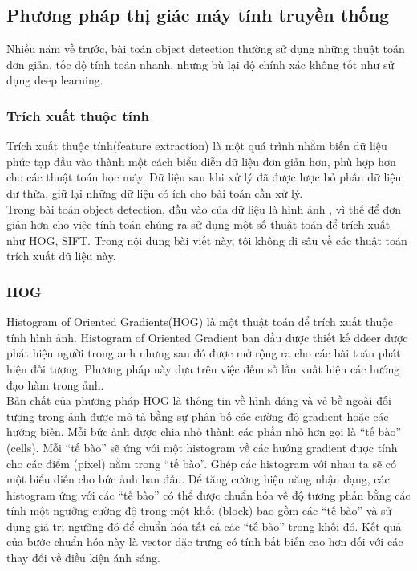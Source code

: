 \documentclass[a4paper]{report}
\begin{document}
\subsection{Phương pháp thị giác máy tính truyền thống}
Nhiều năm về trước, bài toán object detection thường sử dụng những thuật toán đơn giản, tốc độ tính toán nhanh, nhưng bù lại độ chính xác không tốt như sử dụng deep learning.
\subsubsection*{Trích xuất thuộc tính}
Trích xuất thuộc tính(feature extraction) là một quá trình nhằm biến dữ liệu phức tạp đầu vào thành một cách biểu diễn dữ liệu đơn giản hơn, phù hợp hơn cho các thuật toán học máy. Dữ liệu sau khi xử lý đã được lược bỏ phần dữ liệu dư thừa, giữ lại những dữ liệu có ích cho bài toán cần xử lý.
\\

Trong bài toán object detection, đầu vào của dữ liệu là hình ảnh , vì thế để đơn giản hơn cho việc tính toán chúng ra sử dụng một số thuật toán để trích xuất như HOG, SIFT. Trong nội dung bài viết này, tôi không đi sâu về các thuật toán trích xuất dữ liệu này.

\subsubsection{HOG}
Histogram of Oriented Gradients(HOG) là một thuật toán để trích xuất thuộc tính hình ảnh.
Histogram of Oriented Gradient ban đầu được thiết kế ddeer được phát hiện người trong anh nhưng sau đó được mở rộng ra cho các bài toán phát hiện đối tượng. Phương pháp này dựa trên việc đếm số lần xuất hiện các hướng đạo hàm trong ảnh.
\\

Bản chất của phương pháp HOG là thông tin về hình dáng và vẻ bề ngoài đối tượng trong ảnh được mô tả bằng sự phân bố các cường độ gradient hoặc các hướng biên. Mỗi bức ảnh được chia nhỏ thành các phần nhỏ hơn gọi là “tế bào” (cells). Mỗi “tế bào” sẽ ứng với một histogram về các hướng gradient được tính cho các điểm (pixel) nằm trong “tế bào”. Ghép các histogram với nhau ta sẽ có một biểu diễn cho bức ảnh ban đầu. Để tăng cường hiện năng nhận dạng, các histogram ứng với các “tế bào” có thể được chuẩn hóa về độ tương phản bằng các tính một ngưỡng cường độ trong một khối (block) bao gồm các “tế bào” và sử dụng giá trị ngưỡng đó để chuẩn hóa tất cả các “tế bào” trong khối đó. Kết quả của bước chuẩn hóa này là vector đặc trưng có tính bất biến cao hơn đối với các thay đổi về điều kiện ánh sáng.
\end{document}
